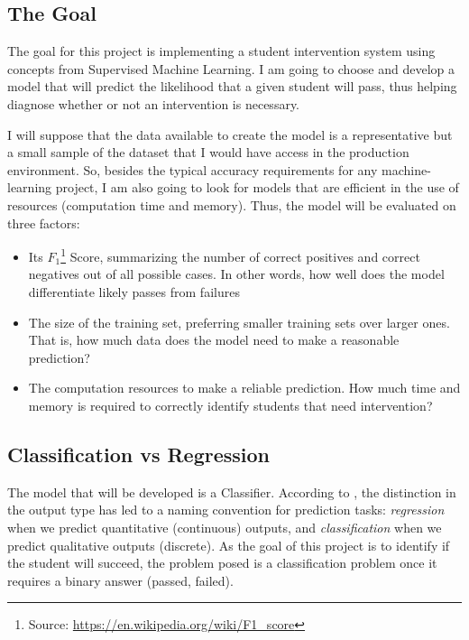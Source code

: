\documentclass[a4paper]{article}
\begin{document}
\subsection{The Goal}
The goal for this project is implementing a student intervention system using concepts from Supervised Machine Learning. I am going to choose and develop a model that will predict the likelihood that a given student will pass, thus helping diagnose whether or not an intervention is necessary.

I will suppose that the data available to create the model is a representative but a small sample of the dataset that I would have access in the production environment. So, besides the typical accuracy requirements for any machine-learning project, I am also going to look for models that are efficient in the use of resources (computation time and memory). Thus, the model will be evaluated on three factors:

\begin{itemize}
\item Its $F_1$\footnote{Source: \url{https://en.wikipedia.org/wiki/F1_score}} Score, summarizing the number of correct positives and correct negatives out of all possible cases. In other words, how well does the model differentiate likely passes from failures
\item The size of the training set, preferring smaller training sets over larger ones. That is, how much data does the model need to make a reasonable prediction?
\item The computation resources to make a reliable prediction. How much time and memory is required to correctly identify students that need intervention?
\end{itemize}

\subsection{Classification vs Regression}
The model that will be developed is a Classifier. According to \cite{Hastie_2009}, the distinction in the output type has led to a naming convention for prediction tasks: \textit{regression} when we predict quantitative (continuous) outputs, and \textit{classification} when we predict qualitative outputs (discrete). As the goal of this project is to identify if the student will succeed, the problem posed is a classification problem once it requires a binary answer (passed, failed).

\end{document}
